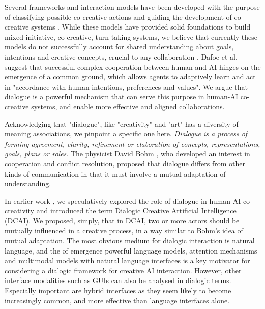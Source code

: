 \documentclass[acmlarge, nonacm, screen]{acmart} %
\begin{document}
Several frameworks and interaction models have been developed with the purpose of classifying possible co-creative actions and guiding the development of co-creative systems \cite{Rezwana_undated-dr, mullermixed, spoto17}. While these models have provided solid foundations to build mixed-initiative, co-creative, turn-taking systems, we believe that currently these models do not successfully account for shared understanding about goals, intentions and creative concepts, crucial to any collaboration \cite{Dafoe2021-in,Hoc2000-iy}. %
Dafoe et al. \cite{Dafoe2021-in} suggest that successful complex cooperation between human and AI hinges on the emergence of a common ground, which allows agents to adaptively learn and act in "accordance with human intentions, preferences and values". We argue that dialogue is a powerful mechanism that can serve this purpose in human-AI co-creative systems, and enable more effective and aligned collaborations.

Acknowledging that "dialogue", like "creativity" and "art" has a diversity of meaning associations, we pinpoint a specific one here. \emph{Dialogue is a process of forming agreement, clarity, refinement or elaboration of concepts, representations, goals, plans or roles}. The physicist David Bohm \cite{bohm2004dialogue}, who developed an interest in cooperation and conflict resolution, proposed that dialogue differs from other kinds of communication in that it must involve a mutual adaptation of understanding. 

In earlier work \citep{bownspeculative2020}, we speculatively explored the role of dialogue in human-AI co-creativity and introduced the term Dialogic Creative Artificial Intelligence (DCAI). We proposed, simply, that in DCAI, two or more actors should be mutually influenced in a creative process, in a way similar to Bohm's idea of mutual adaptation. The most obvious medium for dialogic interaction is natural language, and the of emergence powerful language models, attention mechanisms and multimodal models with natural language interfaces is a key motivator for considering a dialogic framework for creative AI interaction. However, other interface modalities such as GUIs can also be analysed in dialogic terms. Especially important are hybrid interfaces as they seem likely to become increasingly common, and more effective than language interfaces alone.
\end{document}
